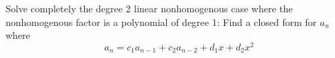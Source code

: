Solve completely the degree 2 linear nonhomogenous case
where the nonhomogenous factor is a polynomial of degree 1:
Find a closed form for $a_n$ where
\[
a_n = c_1 a_{n-1} + c_2 a_{n-2} + d_1x + d_2 x^2
\]

